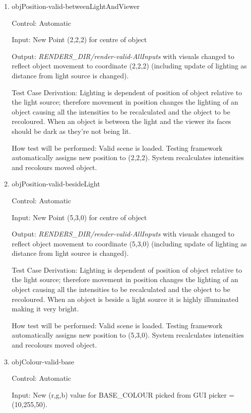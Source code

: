\documentclass[12pt, titlepage]{article}
\begin{document}
\begin{enumerate}
	\item{objPosition-valid-betweenLightAndViewer\\}
	
	Control: Automatic
	
	Input: New Point (2,2,2) for centre of object
	
	Output: \textit{RENDERS\_DIR/render-valid-AllInputs} with visuals changed 
	to reflect object movement to coordinate (2,2,2) (including update of 
	lighting as distance from light source is changed).
	
	Test Case Derivation: Lighting is dependent of position of object relative 
	to the light source; therefore movement in position changes the lighting of 
	an object causing all the intensities to be recalculated and the object to 
	be recoloured. When an object is between the light and the viewer its faces 
	should be dark as they're not being lit.
	
	How test will be performed: Valid scene is loaded. Testing framework 
	automatically assigns new position to (2,2,2). System recalculates 
	intensities and recolours moved object.	
	
	\item{objPosition-valid-besideLight\\}
	
	Control: Automatic
	
	Input: New Point (5,3,0) for centre of object
	
	Output: \textit{RENDERS\_DIR/render-valid-AllInputs} with visuals changed 
	to reflect object movement to coordinate (5,3,0) (including update of 
	lighting as distance from light source is changed).
	
	Test Case Derivation: Lighting is dependent of position of object relative 
	to the light source; therefore movement in position changes the lighting of 
	an object causing all the intensities to be recalculated and the object to 
	be recoloured. When an object is beside a light source it is highly 
	illuminated making it very bright.
	
	How test will be performed: Valid scene is loaded. Testing framework 
	automatically assigns new position to (5,3,0). System recalculates 
	intensities and recolours moved object.			

	\item{objColour-valid-base\\}
	
	Control: Automatic
	
	Input: New (r,g,b) value for BASE\_COLOUR picked from GUI picker = 
	(10,255,50).
	

\end{enumerate}
\end{document}
